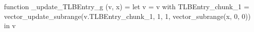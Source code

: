 function _update_TLBEntry_g (v, x) = let v = { v with TLBEntry_chunk_1 = vector_update_subrange(v.TLBEntry_chunk_1, 1, 1, vector_subrange(x, 0, 0)) } in v
